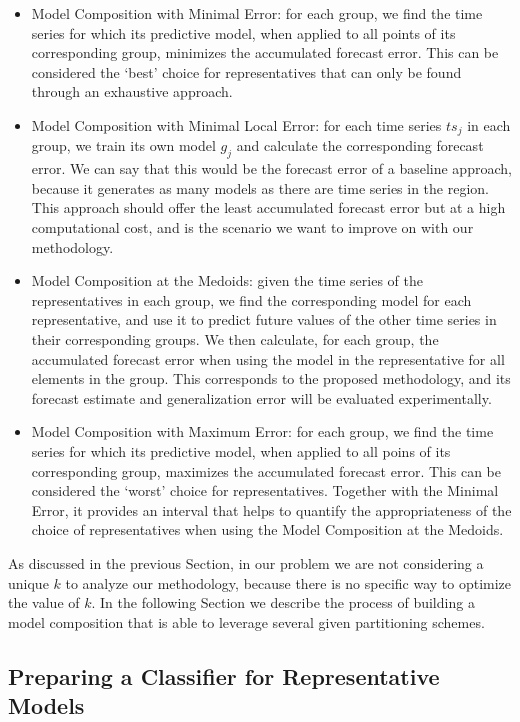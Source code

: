 \begin{itemize}%
	\item Model Composition with Minimal Error: for each group, we find the time series for which its predictive model, when applied to all points of its corresponding group, minimizes the accumulated forecast error. This can be considered the `best' choice for representatives that can only be found through an exhaustive approach.
	\item Model Composition with Minimal Local Error: for each time series $ts_j$ in each group, we train its own model $g_j$ and calculate the corresponding forecast error. We can say that this would be the forecast error of a baseline approach, because it generates as many models as there are time series in the region. This approach should offer the least accumulated forecast error but at a high computational cost, and is the scenario we want to improve on with our methodology.
	\item Model Composition at the Medoids: given the time series of the representatives in each group, we find the corresponding model for each representative, and use it to predict future values of the other time series in their corresponding groups. We then calculate, for each group, the accumulated forecast error when using the model in the representative for all elements in the group. This corresponds to the proposed methodology, and its forecast estimate and generalization error will be evaluated experimentally.
	\item Model Composition with Maximum Error: for each group, we find the time series for which its predictive model, when applied to all poins of its corresponding group, maximizes the accumulated forecast error. This can be considered the `worst' choice for representatives. Together with the Minimal Error, it provides an interval that helps to quantify the appropriateness of the choice of representatives when using the Model Composition at the Medoids.
\end{itemize}

As discussed in the previous Section, in our problem we are not considering a unique $k$ to analyze our methodology, because there is no specific way to optimize the value of $k$. In the following Section we describe the process of building a model composition that is able to leverage several given partitioning schemes.

\subsection{Preparing a Classifier for Representative Models}
\label{Sec:Classifier}

